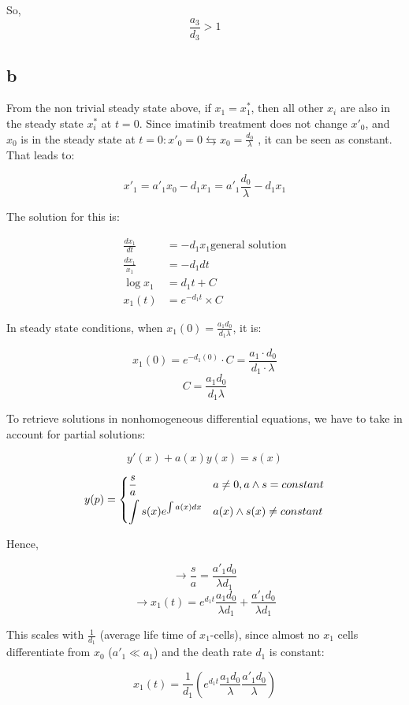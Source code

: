 So, \[\frac{a_3}{d_3}>1\]

\subsection{b}

From the non trivial steady state above, if $x_1 = x^*_1$, then all other $x_i$ are also in the
steady state $x^*_i$ at $t = 0$. Since imatinib treatment does not change $x'_0$, and $x_0$ is in the steady state at  $t = 0 : x'_0 = 0 \leftrightarrows x_0 = \frac{d_0}{\lambda}$ , it can be seen as constant. That leads to:

\[ x'_1 = a'_1x_0 - d_1x_1 = a'_1\frac{d_0}{\lambda} -d_1x_1  \]

The solution for this is: 

\begin{align*}
\frac{dx_1}{dt} &= -d_1x_1 \text{general solution}\\
\frac{dx_1}{x_1} &= -d_1dt \\
\log x_1 &= d_1t+C \\
x_1(t) &= e^{-d_1t}\times C
\end{align*}

In steady state conditions, when $x_1(0) = \frac{a_1d_0}{d_1\lambda}$, it is:

\[ x_1(0) = e^{-d_1(0)} \cdot C = \frac{a_1 \cdot d_0}{ d_1 \cdot \lambda}\]
\[ C = \frac{a_1d_0}{d_1\lambda} \]

To retrieve solutions in nonhomogeneous differential equations, we have to take in account for partial solutions:

\[ y'(x) + a(x)y(x) = s(x) \]


\[
 y(p) = \begin{dcases}
		\frac{s}{a}  & a \neq 0,  a \wedge s = constant\\
		\int s(x) e^{\int a(x)dx} & a(x) \wedge s(x) \neq constant
        \end{dcases}
\]

Hence,

\[ \rightarrow \frac{s}{a} = \frac{a'_1d_0}{\lambda d_1} \]
\[ \rightarrow x_1(t) = e^{d_1t}\frac{a_1d_0}{\lambda d_1} + \frac{a'_1d_0}{\lambda d_1} \]

This scales with $\frac{1}{d_1}$ (average life time of $x_1$-cells), since almost no $x_1$ cells differentiate from $x_0$ ($a'_1 \ll a_1$) and the death rate $d_1$ is constant:

\[ x_1(t) = \frac{1}{d_1} \left(e^{d_1t}\frac{a_1d_0}{\lambda}\frac{a'_1d_0}{\lambda}\right)\]

